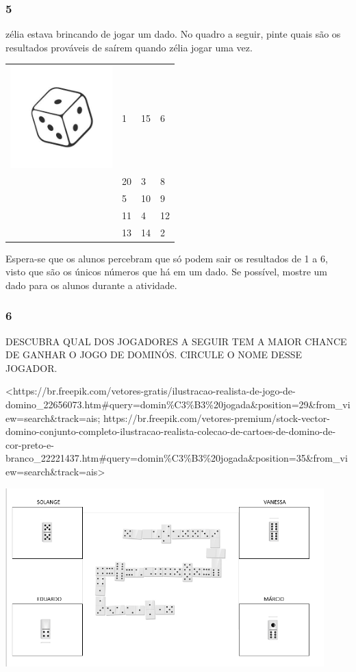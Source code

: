 \subsubsection{5}\label{section-67}

zélia estava brincando de jogar um dado. No quadro a seguir, pinte quais são
os resultados prováveis de saírem quando zélia jogar uma vez.

\begin{longtable}[]{@{}llll@{}}
\toprule
\includegraphics[width=1.55208in,height=1.55208in]{media/image86.jpg} &
1 & 15 & 6\tabularnewline
& 20 & 3 & 8\tabularnewline
& 5 & 10 & 9\tabularnewline
& 11 & 4 & 12\tabularnewline
& 13 & 14 & 2\tabularnewline
\bottomrule
\end{longtable}

Espera-se que os alunos percebram que só podem sair os
resultados de 1 a 6, visto que são os únicos números que há em um
dado. Se possível, mostre um dado para os alunos durante a
atividade.

\subsubsection{6}\label{section-68}

DESCUBRA QUAL DOS JOGADORES A SEGUIR TEM A MAIOR CHANCE DE GANHAR O JOGO
DE DOMINÓS. CIRCULE O NOME DESSE JOGADOR.

\textless{}https://br.freepik.com/vetores-gratis/ilustracao-realista-de-jogo-de-domino\_22656073.htm\#query=domin\%C3\%B3\%20jogada\&position=29\&from\_view=search\&track=ais;
https://br.freepik.com/vetores-premium/stock-vector-domino-conjunto-completo-ilustracao-realista-colecao-de-cartoes-de-domino-de-cor-preto-e-branco\_22221437.htm\#query=domin\%C3\%B3\%20jogada\&position=35\&from\_view=search\&track=ais\textgreater{}

\includegraphics[width=4.84499in,height=2.71476in]{media/image87.png}

